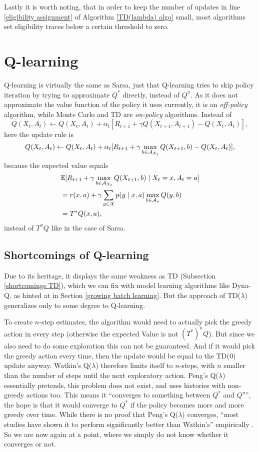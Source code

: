 Lastly it is worth noting, that in order to keep the number of updates in line \ref{eligibility assignment} of Algorithm \ref{TD(lambda) algo} small, most algorithms set eligibility traces below a certain threshold to zero. 

\section{Q-learning}
Q-learning \parencite{watkinsLearningDelayedRewards1989} is virtually the same as Sarsa, just that Q-learning tries to skip policy iteration by trying to approximate \(Q^*\) directly, instead of \(Q^\pi\). As it does not approximate the value function of the policy it uses currently, it is an \emph{off-policy} algorithm, while Monte Carlo and TD are \emph{on-policy} algorithms. Instead of
\[
	Q(X_t,A_t) \gets Q(X_t,A_t) + \alpha_t[R_{t+1}+\gamma Q(X_{t+1},A_{t+1}) -Q(X_t,A_t)],
\]
here the update rule is 
\[
	Q(X_t,A_t) \gets Q(X_t,A_t) + \alpha_t[R_{t+1}+\gamma \max_{b\in\mathcal{A}_{X_t}}Q(X_{t+1}, b) -Q(X_t,A_t)],
\]
because the expected value equals
\begin{align*}
	&\mathbb{E}[R_{t+1}+\gamma \max_{b\in\mathcal{A}_{X_t}}Q(X_{t+1}, b) \mid X_t=x, A_t=a]\\
	&=r(x,a) + \gamma \sum_{y\in\mathcal{X}} p(y\mid x,a) \max_{b\in\mathcal{A}_x} Q(y,b)\\
	&=T^*Q(x,a),
\end{align*}
instead of \(T^\pi Q\) like in the case of Sarsa. 

\subsection{Shortcomings of Q-learning}\label{shortcomings Q-learning}
Due to its heritage, it displays the same weakness as TD (Subsection \ref{shortcomings TD}), which we can fix with model learning algorithms like Dyna-Q, as hinted at in Section \ref{growing batch learning}. But the approach of TD(\(\lambda\)) generalizes only to some degree to Q-learning. 

To create \(n\)-step estimates, the algorithm would need to actually pick the greedy action in every step (otherwise the expected Value is not \((T^*)^n Q\)). But since we also need to do some exploration this can not be guaranteed. And if it would pick the greedy action every time, then the update would be equal to the TD(0) update anyway. Watkin's Q(\(\lambda\)) \parencite{watkinsLearningDelayedRewards1989} therefore limits itself to \(n\)-steps, with \(n\) smaller than the number of steps until the next exploratory action. Peng's Q(\(\lambda\)) \parencite{pengIncrementalMultiStepQLearning1994} essentially pretends, this problem does not exist, and uses histories with non-greedy actions too. This means it ``converges to something between \(Q^*\) and \(Q^\pi\)'', the hope is that it would converge to \(Q^*\) if the policy becomes more and more greedy over time. While there is no proof that Peng's Q(\(\lambda\)) converges, ``most studies have shown it to perform significantly better than Watkin's'' empirically \parencite[184]{suttonReinforcementLearningIntroduction1998}. So we are now again at a point, where we simply do not know whether it converges or not. 

